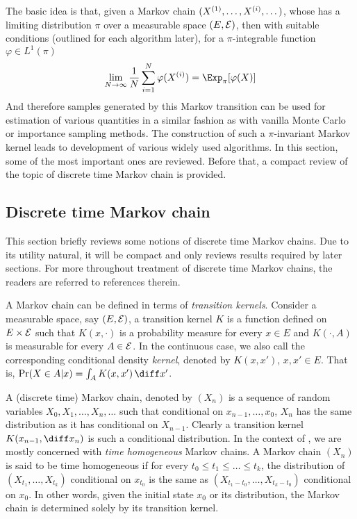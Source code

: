 The basic idea is that, given a Markov chain $(X^{(1)},\dots,X^{(i)},\dots)$,
whose has a limiting distribution $\pi$ over a measurable space $(E,\mathcal{E})$,
then with suitable conditions (outlined for each algorithm later), for a
$\pi$-integrable function $\varphi \in L^1(\pi)$
\begin{equation}
  \lim_{N\to\infty}\frac{1}{N}\sum_{i=1}^N\varphi(\Xiu) =
  \Exp_{\pi}[\varphi(X)]
  \label{eq:mcmc convergence}
\end{equation}
And therefore samples generated by this Markov transition can be used for
estimation of various quantities in a similar fashion as with vanilla Monte
Carlo or importance sampling methods. The construction of such a
$\pi$-invariant Markov kernel leads to development of various widely used
\mcmc algorithms. In this section, some of the most important ones are
reviewed. Before that, a compact review of the topic of discrete time Markov
chain is provided.

\subsection{Discrete time Markov chain}
\label{sub:Discrete time Markov chain}

This section briefly reviews some notions of discrete time Markov chains. Due
to its utility natural, it will be compact and only reviews results required
by later sections. For more throughout treatment of discrete time Markov
chains, the readers are referred to references therein.

A Markov chain can be defined in terms of \emph{transition kernels}. Consider
a measurable space, say $(E,\mathcal{E})$, a transition kernel $K$ is a function defined
on $E\times\mathcal{E}$ such that $K(x,\cdot)$ is a probability measure for every
$x\in E$ and $K(\cdot,A)$ is measurable for every $A\in\mathcal{E}$. In the
continuous case, we also call the corresponding conditional density
\emph{kernel}, denoted by $K(x,x')$, $x,x'\in E$. That is, $\Pr(X\in A|x) =
\int_A K(x,x')\intd x'$.

A (discrete time) Markov chain, denoted by $(X_n)$ is a sequence of random
variables $X_0,X_1,\dots,X_n,\dots$ such that conditional on
$x_{n-1},\dots,x_0$, $X_n$ has the same distribution as it has conditional on
$X_{n-1}$. Clearly a transition kernel $K(x_{n-1},\diff x_n)$ is such a
conditional distribution. In the context of \mcmc, we are mostly concerned
with \emph{time homogeneous} Markov chains. A Markov chain $(X_n)$ is said to
be time homogeneous if for every $t_0\le t_1\le\dots\le t_k$, the distribution
of $(X_{t_1},\dots,X_{t_k})$ conditional on $x_{t_0}$ is the same as
$(X_{t_1-t_0},\dots,X_{t_k-t_0})$ conditional on $x_0$. In other words, given
the initial state $x_0$ or its distribution, the Markov chain is determined
solely by its transition kernel.


